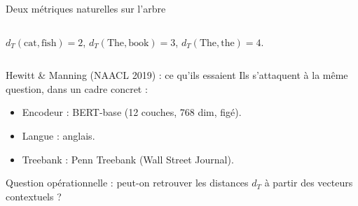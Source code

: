 \documentclass[aspectratio=169,11pt]{beamer}
\begin{document}
\begin{frame}{Deux métriques naturelles sur l'arbre}
\begin{columns}[T]
    \vspace{0.25cm}

    \vspace{0.15cm}
    {\footnotesize $d_T(\text{cat},\text{fish}) = 2$,\;
                   $d_T(\text{The},\text{book}) = 3$,\;
                   $d_T(\text{The},\text{the}) = 4$.}

  \end{columns}

\end{frame}



\begin{frame}{Hewitt \& Manning (NAACL 2019) : ce qu'ils essaient}
  \vspace{0.3cm}
  Ils s'attaquent à \alert{la même question}, dans un cadre concret :
  \begin{itemize}\setlength\itemsep{6pt}
    \item Encodeur : \alert{BERT-base} (12 couches, 768 dim, figé).
    \item Langue : \alert{anglais}.
    \item Treebank : Penn Treebank (Wall Street Journal).
  \end{itemize}

  \vspace{0.6cm}
  \centering
  \large
  \alert{Question opérationnelle :} peut-on retrouver les distances $d_T$
  à partir des vecteurs contextuels ?
\end{frame}
\end{document}
